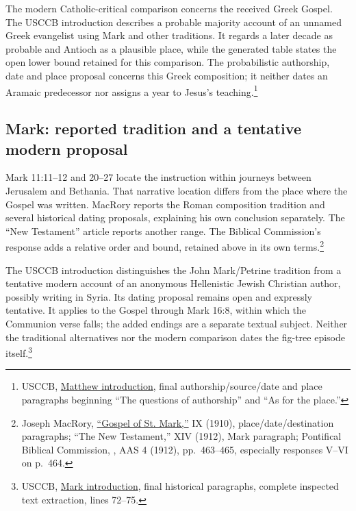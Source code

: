 The modern Catholic-critical comparison concerns the received Greek
Gospel. The USCCB introduction describes a probable majority account
of an unnamed Greek evangelist using Mark and other traditions. It
regards a later decade as probable and Antioch as a plausible place,
while the generated table states the open lower bound retained for
this comparison. The probabilistic authorship, date and place proposal
concerns this Greek composition; it neither dates an Aramaic predecessor
nor assigns a year to Jesus's teaching.\footnote{USCCB,
\href{https://bible.usccb.org/bible/matthew/0}{Matthew introduction},
final authorship/source/date and place paragraphs beginning ``The questions
of authorship'' and ``As for the place.''}

\subsection{Mark: reported tradition and a tentative modern proposal}
\label{hist-mark}
Mark 11:11--12 and 20--27 locate the instruction within journeys between
Jerusalem and Bethania. That narrative location differs from the place
where the Gospel was written. MacRory reports the Roman composition
tradition and several historical dating proposals, explaining his own
conclusion separately. The ``New Testament'' article reports another
range. The Biblical Commission's response adds a relative order and
bound, retained above in its own terms.\footnote{Joseph MacRory,
\href{https://www.newadvent.org/cathen/09674b.htm}{``Gospel of St.
Mark,''}  IX (1910), place/date/destination
paragraphs; ``The New Testament,'' XIV (1912), Mark paragraph;
Pontifical Biblical Commission, ,
AAS 4 (1912), pp.~463--465, especially responses V--VI on p.~464.}

The USCCB introduction distinguishes the John Mark/Petrine tradition
from a tentative modern account of an anonymous Hellenistic Jewish
Christian author, possibly writing in Syria. Its dating proposal remains
open and expressly tentative. It applies to the Gospel through Mark
16:8, within which the Communion verse falls; the added endings are
a separate textual subject. Neither the traditional alternatives nor
the modern comparison dates the fig-tree episode itself.\footnote{USCCB,
\href{https://bible.usccb.org/bible/mark/0}{Mark introduction}, final
historical paragraphs, complete inspected text extraction, lines 72--75.}


